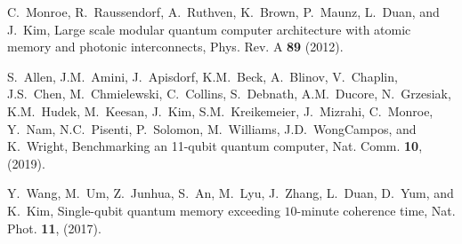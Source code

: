 \documentclass[12pt,a4paper]{amsart}
\numberwithin{equation}{section}
\theoremstyle{plain}
\theoremstyle{definition}
\begin{document}
\begin{thebibliography}{40}
C.~Monroe, R.~Raussendorf, A.~Ruthven, K.~Brown, P.~Maunz, L.~Duan, and J.~Kim, Large scale modular quantum computer architecture with atomic memory and photonic interconnects, Phys. Rev. A \textbf{89} (2012).

S.~Allen, J.M.~Amini, J.~Apisdorf, K.M.~Beck, A.~Blinov, V.~Chaplin, J.S.~Chen, M.~Chmielewski, C.~Collins, S.~Debnath, A.M.~Ducore, N.~Grzesiak, K.M.~Hudek, M.~Keesan, J.~Kim, S.M.~Kreikemeier, J.~Mizrahi, C.~Monroe, Y.~Nam, N.C.~Pisenti, P.~Solomon, M.~Williams, J.D.~WongCampos, and K.~Wright, Benchmarking an 11-qubit quantum computer, Nat. Comm. \textbf{10}, (2019).


Y.~Wang, M.~Um, Z.~Junhua, S.~An, M.~Lyu, J.~Zhang, L.~Duan, D.~Yum, and K.~Kim, Single-qubit quantum memory exceeding $10$-minute coherence time, Nat. Phot. \textbf{11}, (2017).

\end{thebibliography}
\end{document}
